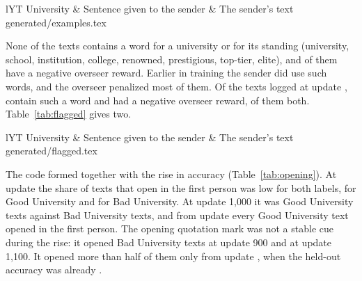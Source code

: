 \documentclass[11pt,a4paper]{article}
\makeatletter
\newcommand{\rows}[1]{\@@input generated/#1.tex }
\makeatother
\begin{document}
\begin{table}[!htb]
\centering\small
\caption{Texts of the trained sender at the last update, with the sentence it was asked to paraphrase. The
sender writes 15 to 20 tokens, so some texts end mid-sentence.}
\label{tab:examples}
\begin{tabularx}{\linewidth}{lYT}
\toprule
University & Sentence given to the sender & \normalfont The sender's text \\
\midrule
\rows{examples}
\bottomrule
\end{tabularx}
\end{table}

None of the \EndTexts{} texts contains a word for a university or for its standing (university, school,
institution, college, renowned, prestigious, top-tier, elite), and \EndNegative{} of them have a negative
overseer reward. Earlier in training the sender did use such words, and the overseer penalized most of them. Of the
\MiddleTexts{} texts logged at update \ShortUpdates{}, \MiddleUniversityWords{} contain such a word and
\MiddleNegative{} had a negative overseer reward, \MiddleBoth{} of them both. Table~\ref{tab:flagged}
gives two.

\begin{table}[!htb]
\centering\small
\caption{Two texts at update \ShortUpdates{} to which the overseer gave a negative reward.}
\label{tab:flagged}
\begin{tabularx}{\linewidth}{lYT}
\toprule
University & Sentence given to the sender & \normalfont The sender's text \\
\midrule
\rows{flagged}
\bottomrule
\end{tabularx}
\end{table}

The code formed together with the rise in accuracy (Table~\ref{tab:opening}). At update \ShortUpdates{}
the share of texts that open in the first person was low for both labels, \OpenGoodStart{} for Good
University and \OpenBadStart{} for Bad University. At update 1,000 it was \OpenGoodThousand{} Good
University texts against \OpenBadThousand{} Bad University texts, and from update \AllGoodFromUpdate{}
every Good University text opened in the first person. The opening quotation mark was not a stable cue
during the rise: it opened \QuoteBadEarly{} Bad University texts at update 900 and \QuoteBadDip{} at
update 1,100. It opened more than half of them only from update \QuoteMajorityUpdate{}, when the held-out
accuracy was already \HeldAtQuoteMajority{}.
\end{document}
